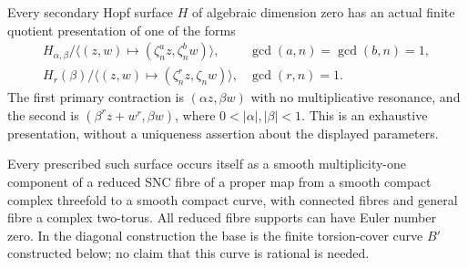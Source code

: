 
\begin{proposition}\label{cdp:st:C.2.UN.43}
Every secondary Hopf surface $H$ of algebraic dimension zero
has an actual finite quotient presentation of one of the forms
\[
\begin{array}{ll}
 H_{\alpha,\beta}/\langle(z,w)\mapsto
          (\zeta_n^a z,\zeta_n^b w)\rangle,
 &\gcd(a,n)=\gcd(b,n)=1,\\[2pt]
 H_r(\beta)/\langle(z,w)\mapsto
          (\zeta_n^r z,\zeta_n w)\rangle,
 &\gcd(r,n)=1.
\end{array}
\tag{C.SH.1}\label{cdp:eq:C.SH.1}
\]
The first primary contraction is $(\alpha z,\beta w)$ with no
multiplicative resonance, and the second is
$(\beta^r z+w^r,\beta w)$, where $0<|\alpha|,|\beta|<1$.
This is an exhaustive presentation, without a uniqueness
assertion about the displayed parameters.

Every prescribed such surface occurs itself as a smooth
multiplicity-one component of a reduced SNC fibre of a proper
map from a smooth compact complex threefold to a smooth
compact curve, with connected fibres and general fibre a
complex two-torus. All reduced fibre supports can have Euler
number zero. In the diagonal construction the base is the
finite torsion-cover curve $B'$ constructed below; no claim
that this curve is rational is needed.
\end{proposition}

